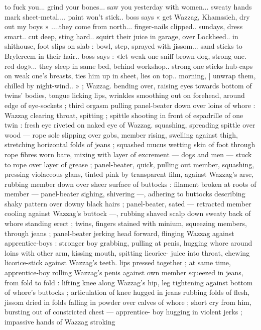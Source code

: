 to fuck you... grind your bones... saw you yesterday with women...
sweaty hands mark sheet-metal.... paint won't stick.. boss says « get
Wazzag, Khamssieh, dry out my boys » ....they come from north...
finger-nails clipped.. sundays, dress smart.. cut deep, sting hard..
squirt their juice in garage, over Lockheed.. in shithouse, foot slips
on slab : bowl, step, sprayed with jissom... sand sticks to Brylcreem
in their hair.. boss says : «let weak one sniff brown dog, strong one.
red dog»... they sleep in same bed, behind workshop.. strong one
sticks hub-caps on weak one's breasts, ties him up in sheet, lies on
top.. morning, | unwrap them, chilled by night-wind.. » ; Wazzag.
bending over, raising eyes towards bottom of twins’ bodies, tongue
licking lips, wrinkles smoothing out on forehead, around edge of
eye-sockets ; third orgasm pulling panel-beater down over loins of
whore : Wazzag clearing throat, spitting ; spittle shooting in front of
espadrille of one twin : fresh eye riveted on naked eye of Wazzag.
squashing, spreading spittle over wood --- rope sole slipping over
gobs, member rising, swelling against thigh, stretching horizontal
folds of jeans ; squashed mucus wetting skin of foot through rope
fibres worn bare, mixing with layer of excrement --- dogs and men
--- stuck to rope over layer of grease ; panel-beater, quick, pulling
out member, squashing, pressing violaceous glans, tinted pink by
transparent film, against Wazzag's arse, rubbing member down over
sheer surface of buttocks : filament broken at roots of member ---
panel-beater sighing, shivering ---, adhering to buttocks describing
shaky pattern over downy black hairs ; panel-beater, sated ---
retracted member cooling against Wazzag's buttock ---, rubbing
shaved scalp down sweaty back of whore standing erect ; twins,
fingers stained with minium, squeezing members, through jeans ;
panel-beater jerking head forward, flinging Wazzag against
apprentice-boys : stronger boy grabbing, pulling at penis, hugging
whore around loins with other arm, kissing mouth, spitting licorice-
juice into throat, chewing licorice-stick against Wazzag's teeth. lips
pressed together ; at same time, apprentice-boy rolling Wazzag’s
penis against own member squeezed in jeans, from fold to fold :
lifting knee along Wazzag's hip, leg tightening against bottom of
whore’s buttocks ; articulation of knee hugged in jeans rubbing folds
of flesh, jissom dried in folds falling in powder over calves of whore
; short cry from him, bursting out of constricted chest --- apprentice-
boy hugging in violent jerks ; impassive hands of Wazzag stroking
